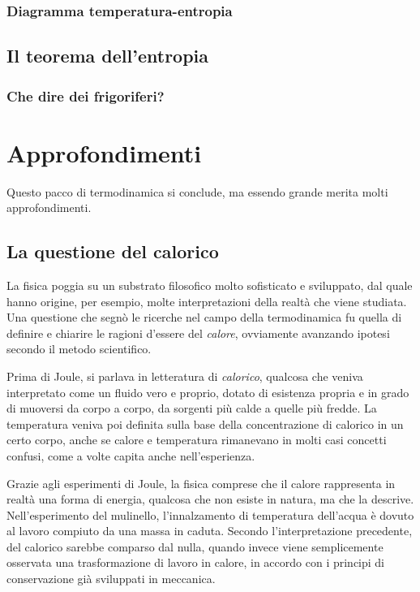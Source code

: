 \subsubsection*{Diagramma temperatura-entropia}







\subsection{Il teorema dell'entropia}



\subsubsection{Che dire dei frigoriferi?}






\section{Approfondimenti}
Questo pacco di termodinamica si conclude, ma essendo grande
merita molti approfondimenti.

\subsection{La questione del calorico}
La fisica poggia su un substrato filosofico molto sofisticato e
sviluppato, dal quale hanno origine, per esempio, molte interpretazioni
della realtà che viene studiata. Una questione che segnò le ricerche
nel campo della termodinamica fu quella di definire e chiarire le
ragioni d'essere del \textit{calore}, ovviamente avanzando ipotesi
secondo il metodo scientifico.

Prima di Joule, si parlava in letteratura di \textit{calorico},
qualcosa che veniva interpretato come un fluido vero e proprio,
dotato di esistenza propria e in grado di muoversi da corpo a
corpo, da sorgenti più calde a quelle più fredde. La temperatura
veniva poi definita sulla base della concentrazione di calorico
in un certo corpo, anche se calore e temperatura rimanevano in
molti casi concetti confusi, come a volte capita anche nell'esperienza.

Grazie agli esperimenti di Joule, la fisica comprese che il calore
rappresenta in realtà una forma di energia, qualcosa che
non esiste in natura, ma che la descrive. Nell'esperimento del
mulinello, l'innalzamento di temperatura dell'acqua è dovuto al
lavoro compiuto da una massa in caduta. Secondo l'interpretazione
precedente, del calorico sarebbe comparso dal nulla, quando invece
viene semplicemente osservata una trasformazione di lavoro in calore,
in accordo con i principi di conservazione già sviluppati in meccanica.


